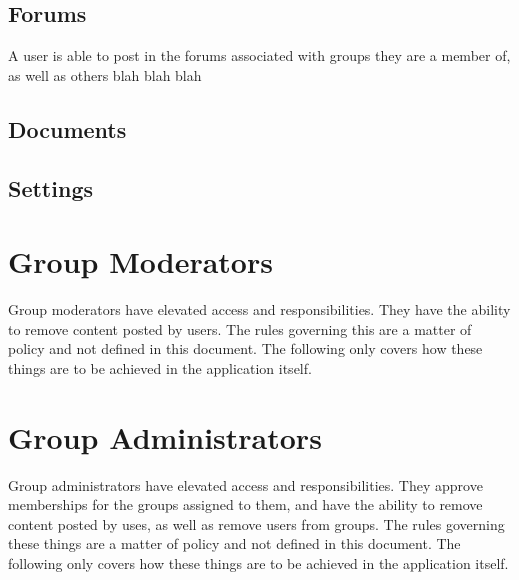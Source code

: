 \documentclass[10pt]{article}
\begin{document}
\subsection{Forums}
\begin{flushleft}
A user is able to post in the forums associated with groups they are a member of, as well as others blah blah blah


\end{flushleft}

\subsection{Documents}

\subsection{Settings}





\section{Group Moderators}
Group moderators have elevated access and responsibilities.  They have the ability to remove content posted by users.  The rules governing this are a matter of policy and not defined in this document.  The following only covers how these things are to be achieved in the application itself. 









\section{Group Administrators}
Group administrators have elevated access and responsibilities.  They approve memberships for the groups assigned to them, and have the ability to remove content posted by uses, as well as remove users from groups.  The rules governing these things are a matter of policy and not defined in this document.  The following only covers how these things are to be achieved in the application itself. 
\end{document}
